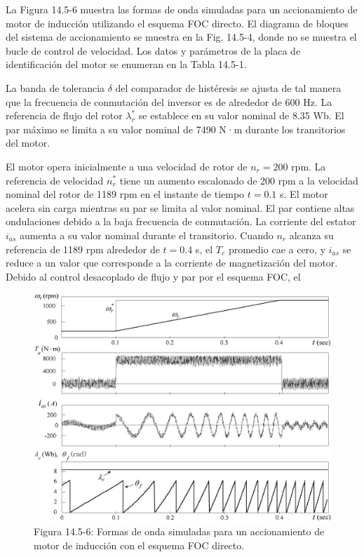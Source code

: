 \documentclass[letterpaper,12pt]{article} %
\begin{document}
La Figura 14.5-6 muestra las formas de onda simuladas para un accionamiento de motor de inducción utilizando el esquema FOC directo. El diagrama de bloques del sistema de accionamiento se muestra en la Fig. 14.5-4, donde no se muestra el bucle de control de velocidad. Los datos y parámetros de la placa de identificación del motor se enumeran en la Tabla 14.5-1.

La banda de tolerancia \( \delta \) del comparador de histéresis se ajusta de tal manera que la frecuencia de conmutación del inversor es de alrededor de 600 Hz. La referencia de flujo del rotor \( \lambda_r^* \) se establece en su valor nominal de 8.35 Wb. El par máximo se limita a su valor nominal de 7490 N·m durante los transitorios del motor.

El motor opera inicialmente a una velocidad de rotor de \( n_r = 200 \) rpm. La referencia de velocidad \( n_r^* \) tiene un aumento escalonado de 200 rpm a la velocidad nominal del rotor de 1189 rpm en el instante de tiempo \( t = 0.1 \) s. El motor acelera sin carga mientras su par se limita al valor nominal. El par contiene altas ondulaciones debido a la baja frecuencia de conmutación. La corriente del estator \( i_{as} \) aumenta a su valor nominal durante el transitorio. Cuando \( n_r \) alcanza su referencia de 1189 rpm alrededor de \( t = 0.4 \) s, el \( T_e \) promedio cae a cero, y \( i_{as} \) se reduce a un valor que corresponde a la corriente de magnetización del motor. Debido al control desacoplado de flujo y par por el esquema FOC, el

\begin{figure}[ht]
    \centering
    \includegraphics{graficos/img18.jpg} 
    \caption{Figura 14.5-6: Formas de onda simuladas para un accionamiento de motor de inducción con el esquema FOC directo.}
    \label{fig:14.5-6}
\end{figure}
\FloatBarrier
\end{document}
